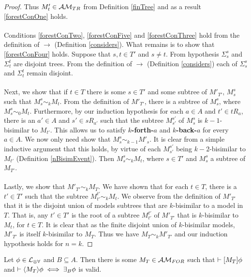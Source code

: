 \begin{proof}
Thus $M'_t \in \mathcal{AM}_{TR}$ from Definition \ref{finTree} and as a result \ref{forestConOne} holds.\\
\\
Conditions \ref{forestConTwo}, \ref{forestConFive} and \ref{forestConThree} hold from the definition
of $\to$ (Definition \ref{considers}).
What remains is to show that \ref{forestConFour} holds.
Suppose that $s, t \in T'$ and $s \neq t$.
From hypothesis $\Sigma^s_s$ and $\Sigma^t_t$ are disjoint trees.
From the definition of $\to$ (Definition \ref{considers}) each of $\Sigma^s_s$ and $\Sigma^t_t$
remain disjoint.\\
\\
Next, we show that if $t \in T$ there is some $s \in T'$ and some subtree of $M'_{T'}$, $M^{s}_{s}$
such that $M^s_s \sim_k M_t$.
From the definition of $M'_{T'}$, there is a subtree of $M^s_s$, where $M^s_s \sim_0 M_t$.
Furthermore, by our induction hypothesis for each $a \in A$ and $t' \in t R_a$, there is an $a' \in
A$ and $s' \in s R_{a'}$ such that the subtree $M^{s'}_{s'}$ of $M^s_s$ is $k-1$-bisimilar to
$M_{t'}$.
This allows us to satisfy {\bf $k$-forth-$a$} and {\bf $k$-back-$a$} for every $a \in A$.
We now only need show that $M^s_s \sim_{k-1} M'_s$.
It is clear from a simple inductive argument that this holds, by virtue of each $M^{s'}_{s'}$ being
$k-2$-bisimilar to $M_{t'}$ (Definition \ref{nBisimEvent}).
Then $M^s_s \sim_k M_t$, where $s \in T'$ and $M^s_s$ a subtree of $M_{T'}$.\\
\\
Lastly, we show that $M'_{T'} \sim_k M_T$.
We have shown that for each $t \in T$, there is a $t' \in T'$ such that the subtree $M^{t'}_{t'}
\sim_k M_t$.
We observe from the definition of $M'_{T'}$ that it is the disjoint union of models subtrees that
are $k$-bisimilar to a model in $T$.
That is, any $t' \in T'$ is the root of a subtree $M^{t'}_{t'}$ of $M'_{T'}$ that is $k$-bisimilar
to $M_t$, for $t \in T$.
It is clear that as the finite disjoint union of $k$-bisimilar models, $M'_{T'}$ is itself $k$-bisimilar
to $M_T$.
Thus we have $M_T \sim_k M'_{T'}$ and our induction hypothesis holds for $n = k$.
\end{proof}

\begin{corr} \label{approximatingBRestricted}
Let $\phi \in \mathcal{L}_{\otimes\forall}$ and $B \subseteq A$.
Then there is some $M_T \in \mathcal{AM}_{FOR}$ such that $\vdash [{M_T}] \phi$ and
$\vdash \langle {M_T} \rangle \phi \iff \exists_B \phi$ is valid.
\end{corr}

